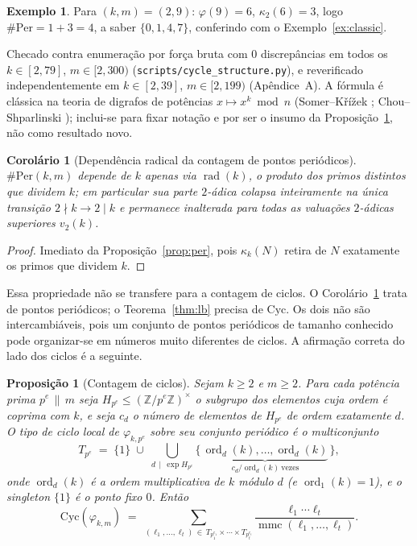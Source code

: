\documentclass[11pt]{article}
\newtheorem{proposition}[theorem]{Proposição}
\newtheorem{corollary}[theorem]{Corolário}
\theoremstyle{definition}
\newtheorem{example}[theorem]{Exemplo}
\theoremstyle{remark}
\newcommand{\Cyc}{\mathrm{Cyc}}
\newcommand{\Per}{\mathrm{Per}}
\DeclareMathOperator{\ord}{ord}
\DeclareMathOperator{\rad}{rad}
\DeclareMathOperator{\mmc}{mmc}
\begin{document}
\begin{example}
Para $(k,m) = (2,9)$: $\varphi(9) = 6$, $\kappa_2(6) = 3$, logo $\#\Per = 1 + 3 = 4$, a saber $\{0,1,4,7\}$, conferindo com o Exemplo~\ref{ex:classic}.
\end{example}

Checado contra enumeração por força bruta com 0 discrepâncias em todos os $k \in [2,79]$, $m \in [2,300)$ (\texttt{scripts/cycle\_structure.py}), e reverificado independentemente em $k \in [2,39]$, $m \in [2,199)$ (Apêndice~A). A fórmula é clássica na teoria de digrafos de potências $x \mapsto x^k \bmod n$ (Somer--K\v{r}\'i\v{z}ek \cite{somer-krizek}; Chou--Shparlinski \cite{chou-shparlinski}); inclui-se para fixar notação e por ser o insumo da Proposição~\ref{prop:cyc}, não como resultado novo.

\begin{corollary}[Dependência radical da contagem de pontos periódicos]\label{cor:radical}
$\#\Per(k,m)$ depende de $k$ apenas via $\rad(k)$, o produto dos primos distintos que dividem $k$; em particular sua parte $2$-ádica colapsa inteiramente na única transição $2 \nmid k \to 2 \mid k$ e permanece inalterada para todas as valuações $2$-ádicas superiores $v_2(k)$.
\end{corollary}

\begin{proof}
Imediato da Proposição~\ref{prop:per}, pois $\kappa_k(N)$ retira de $N$ exatamente os primos que dividem $k$.
\end{proof}

Essa propriedade não se transfere para a contagem de ciclos. O Corolário~\ref{cor:radical} trata de pontos periódicos; o Teorema~\ref{thm:lb} precisa de $\Cyc$. Os dois não são intercambiáveis, pois um conjunto de pontos periódicos de tamanho conhecido pode organizar-se em números muito diferentes de ciclos. A afirmação correta do lado dos ciclos é a seguinte.

\begin{proposition}[Contagem de ciclos]\label{prop:cyc}
Sejam $k \ge 2$ e $m \ge 2$. Para cada potência prima $p^e \,\|\, m$ seja $H_{p^e} \le (\mathbb{Z}/p^e\mathbb{Z})^\times$ o subgrupo dos elementos cuja ordem é coprima com $k$, e seja $c_d$ o número de elementos de $H_{p^e}$ de ordem exatamente $d$. O tipo de ciclo local de $\varphi_{k,p^e}$ sobre seu conjunto periódico é o multiconjunto
\[
T_{p^e} \;=\; \{1\} \;\cup\; \bigcup_{d \,\mid\, \exp H_{p^e}} \Big\{\, \underbrace{\ord_d(k), \dots, \ord_d(k)}_{c_d/\ord_d(k) \ \text{vezes}} \,\Big\},
\]
onde $\ord_d(k)$ é a ordem multiplicativa de $k$ módulo $d$ (e $\ord_1(k) = 1$), e o singleton $\{1\}$ é o ponto fixo $0$. Então
\[
\Cyc(\varphi_{k,m}) \;=\; \sum_{(\ell_1,\dots,\ell_t) \,\in\, T_{p_1^{e_1}} \times \cdots \times T_{p_t^{e_t}}} \frac{\ell_1 \cdots \ell_t}{\mmc(\ell_1,\dots,\ell_t)}.
\]
\end{proposition}
\end{document}

